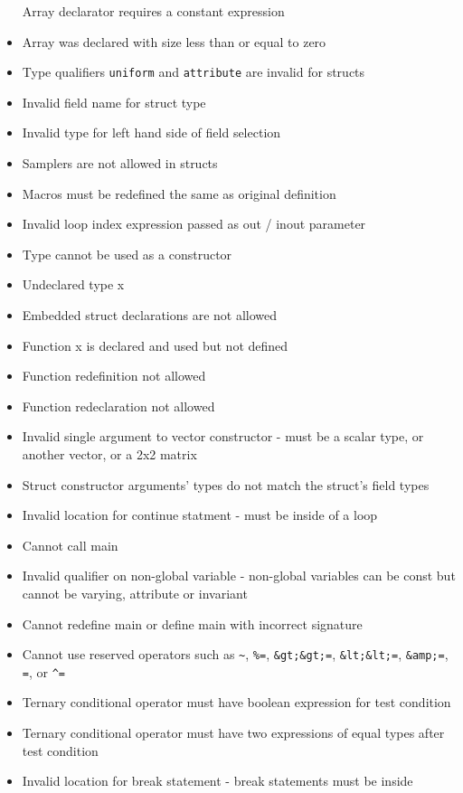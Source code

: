 \begin{itemize}
  Array declarator requires a constant expression
\item
  Array was declared with size less than or equal to zero
\item
  Type qualifiers \texttt{uniform} and \texttt{attribute} are invalid
  for structs
\item
  Invalid field name for struct type
\item
  Invalid type for left hand side of field selection
\item
  Samplers are not allowed in structs
\item
  Macros must be redefined the same as original definition
\item
  Invalid loop index expression passed as out / inout parameter
\item
  Type cannot be used as a constructor
\item
  Undeclared type x
\item
  Embedded struct declarations are not allowed
\item
  Function x is declared and used but not defined
\item
  Function redefinition not allowed
\item
  Function redeclaration not allowed
\item
  Invalid single argument to vector constructor - must be a scalar type,
  or another vector, or a 2x2 matrix
\item
  Struct constructor arguments' types do not match the struct's field
  types
\item
  Invalid location for continue statment - must be inside of a loop
\item
  Cannot call main
\item
  Invalid qualifier on non-global variable - non-global variables can be
  const but cannot be varying, attribute or invariant
\item
  Cannot redefine main or define main with incorrect signature
\item
  Cannot use reserved operators such as \texttt{\textasciitilde{}},
  \texttt{\%=}, \texttt{\&gt;\&gt;=}, \texttt{\&lt;\&lt;=},
  \texttt{\&amp;=}, \texttt{\textbar{}=}, or \texttt{\^{}=}
\item
  Ternary conditional operator must have boolean expression for test
  condition
\item
  Ternary conditional operator must have two expressions of equal types
  after test condition
\item
  Invalid location for break statement - break statements must be inside

\end{itemize}
